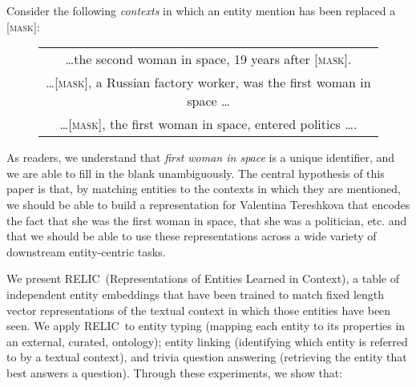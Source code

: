 \documentclass{article} \usepackage{iclr2020_conference,times}
\newcommand{\blank}{\textsc{[mask]}}
\newcommand{\ack}{RELIC\xspace}
\begin{document}
Consider the following \emph{contexts} in which an entity mention has been replaced a \blank:


\begin{figure}[h]
    \centering
    \footnotesize
    \begin{tabular}{c}
        \dots the second woman in space, 19 years after \blank. \vspace{3pt}\\
        \dots \blank, a Russian factory worker, was the first woman in space \dots \vspace{3pt}\\
         \dots \blank, the first woman in space, entered politics \dots.
    \end{tabular}
\label{fig:my_label}
\end{figure}
\noindent
As readers, we understand that \emph{first woman in space} is a unique identifier, and we are able to fill in the blank unambiguously. 
The central hypothesis of this paper is that, by matching entities to the contexts in which they are mentioned, we should be able to build a representation for Valentina Tereshkova that encodes the fact that she was the first woman in space, that she was a politician, etc. and that we should be able to use these representations across a wide variety of downstream entity-centric tasks.

We present \ack~(Representations of Entities Learned in Context), a table of independent entity embeddings that have been trained to match fixed length vector representations of the textual context in which those entities have been seen.
We apply \ack~to entity typing (mapping each entity to its properties in an external, curated, ontology); entity linking (identifying which entity is referred to by a textual context), and trivia question answering (retrieving the entity that best answers a question). 
Through these experiments, we show that:
\end{document}
